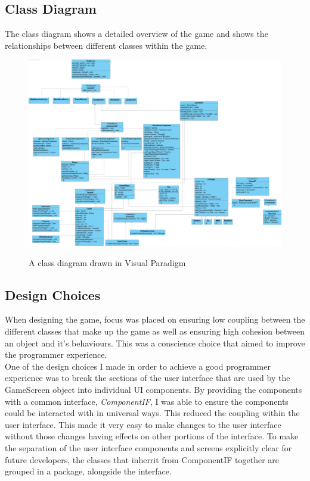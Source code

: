 \documentclass[a4paper,12pt]{article}
\begin{document}
\subsection*{Class Diagram}
The class diagram shows a detailed overview of the game and shows the relationships between different classes within the game.
\newpage
\begin{figure}[!h]
	\begin{center}
		\includegraphics[width=23cm, angle=90, origin=h]{images/Class-Diagram.jpg}
		\\
		\caption{A class diagram drawn in Visual Paradigm}
	\end{center}
\end{figure}

\subsection*{Design Choices}
When designing the game, focus was placed on ensuring low coupling between the different classes that make up the game as well as ensuring high cohesion between an object and it's behaviours. This was a conscience choice that aimed to improve the programmer experience.
\\
One of the design choices I made in order to achieve a good programmer experience was to break the sections of the user interface that are used by the GameScreen object into individual UI components. By providing the components with a common interface, \textit{ComponentIF}, I was able to ensure the components could be interacted with in universal ways. This reduced the coupling within the user interface. This made it very easy to make changes to the user interface without those changes having effects on other portions of the interface. To make the separation of the user interface components and screens explicitly clear for future developers, the classes that inherrit from ComponentIF together are grouped in a package, alongside the interface. 
\end{document}
